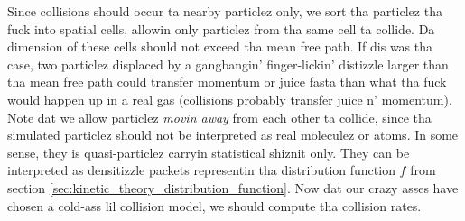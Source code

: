 Since collisions should occur ta nearby particlez only, we sort tha particlez tha fuck into spatial cells, allowin only particlez from tha same cell ta collide. Da dimension of these cells should not exceed tha mean free path. If dis was tha case, two particlez displaced by a gangbangin' finger-lickin' distizzle larger than tha mean free path could transfer momentum or juice fasta than what tha fuck would happen up in a real gas (collisions probably transfer juice n' momentum). Note dat we allow particlez \textit{movin away} from each other ta collide, since tha simulated particlez should not be interpreted as real moleculez or atoms. In some sense, they is quasi-particlez carryin statistical shiznit only. They can be interpreted as densitizzle packets representin tha distribution function $f$ from section \ref{sec:kinetic_theory_distribution_function}. Now dat our crazy asses have chosen a cold-ass lil collision model, we should compute tha collision rates.

